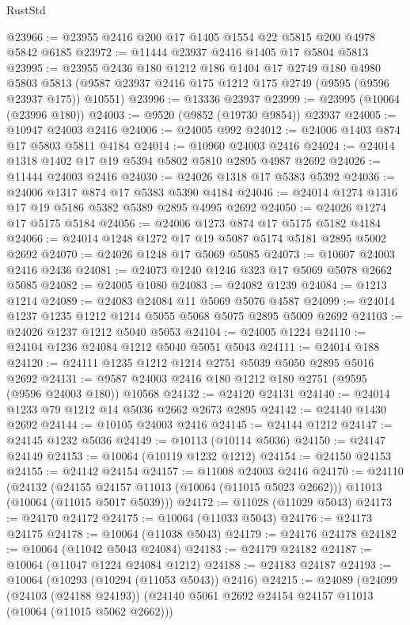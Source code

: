 \begin{lexlean}{RustStd}
\begin{coremodule}
@23966 := @23955 @2416 @200 @17 @1405 @1554 @22 @5815 @200 @4978 @5842 @6185
@23972 := @11444 @23937 @2416 @1405 @17 @5804 @5813
@23995 := @23955
    @2436
    @180
    @1212
    @186
    @1404
    @17
    @2749
    @180
    @4980
    @5803
    @5813
    (@9587 @23937 @2416 @175 @1212 @175 @2749 (@9595 (@9596 @23937 @175)) @10551)
@23996 := @13336 @23937
@23999 := @23995 (@10064 (@23996 @180))
@24003 := @9520 (@9852 (@19730 @9854)) @23937
@24005 := @10947 @24003 @2416
@24006 := @24005 @992
@24012 := @24006 @1403 @874 @17 @5803 @5811 @4184
@24014 := @10960 @24003 @2416
@24024 := @24014 @1318 @1402 @17 @19 @5394 @5802 @5810 @2895 @4987 @2692
@24026 := @11444 @24003 @2416
@24030 := @24026 @1318 @17 @5383 @5392
@24036 := @24006 @1317 @874 @17 @5383 @5390 @4184
@24046 := @24014 @1274 @1316 @17 @19 @5186 @5382 @5389 @2895 @4995 @2692
@24050 := @24026 @1274 @17 @5175 @5184
@24056 := @24006 @1273 @874 @17 @5175 @5182 @4184
@24066 := @24014 @1248 @1272 @17 @19 @5087 @5174 @5181 @2895 @5002 @2692
@24070 := @24026 @1248 @17 @5069 @5085
@24073 := @10607 @24003 @2416 @2436
@24081 := @24073 @1240 @1246 @323 @17 @5069 @5078 @2662 @5085
@24082 := @24005 @1080
@24083 := @24082 @1239
@24084 := @1213 @1214
@24089 := @24083 @24084 @11 @5069 @5076 @4587
@24099 := @24014 @1237 @1235 @1212 @1214 @5055 @5068 @5075 @2895 @5009 @2692
@24103 := @24026 @1237 @1212 @5040 @5053
@24104 := @24005 @1224
@24110 := @24104 @1236 @24084 @1212 @5040 @5051 @5043
@24111 := @24014 @188
@24120 := @24111 @1235 @1212 @1214 @2751 @5039 @5050 @2895 @5016 @2692
@24131 := @9587 @24003 @2416 @180 @1212 @180 @2751 (@9595 (@9596 @24003 @180)) @10568
@24132 := @24120 @24131
@24140 := @24014 @1233 @79 @1212 @14 @5036 @2662 @2673 @2895
@24142 := @24140 @1430 @2692
@24144 := @10105 @24003 @2416
@24145 := @24144 @1212
@24147 := @24145 @1232 @5036
@24149 := @10113 (@10114 @5036)
@24150 := @24147 @24149
@24153 := @10064 (@10119 @1232 @1212)
@24154 := @24150 @24153
@24155 := @24142 @24154
@24157 := @11008 @24003 @2416
@24170 := @24110
    (@24132
      (@24155 @24157 @11013 (@10064 (@11015 @5023 @2662)))
      @11013
      (@10064 (@11015 @5017 @5039)))
@24172 := @11028 (@11029 @5043)
@24173 := @24170 @24172
@24175 := @10064 (@11033 @5043)
@24176 := @24173 @24175
@24178 := @10064 (@11038 @5043)
@24179 := @24176 @24178
@24182 := @10064 (@11042 @5043 @24084)
@24183 := @24179 @24182
@24187 := @10064 (@11047 @1224 @24084 @1212)
@24188 := @24183 @24187
@24193 := @10064 (@10293 (@10294 (@11053 @5043)) @2416)
@24215 := @24089
    (@24099
      (@24103 (@24188 @24193))
      (@24140 @5061 @2692 @24154 @24157 @11013 (@10064 (@11015 @5062 @2662)))

\end{coremodule}
\end{lexlean}
